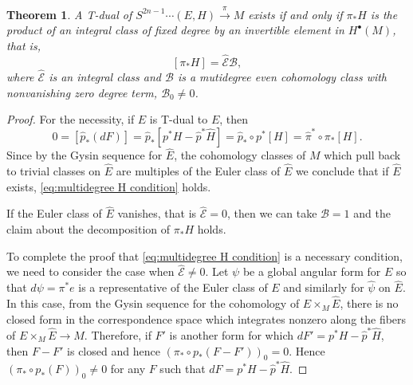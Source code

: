 \documentclass[12pt,twoside]{article}
\theoremstyle{plain}
\newtheorem{theorem}{Theorem}[section]
\theoremstyle{definition}
\newcommand{\mc}[1]{\text{$\mathcal{#1}$}}
\numberwithin{equation}{section}
\begin{document}
\begin{theorem}
A T-dual of $S^{2n-1}{\cdots} (E,H) \stackrel{\pi}{\longrightarrow} M$ exists if and only if $\pi_*H$ is the product of an integral class of fixed degree by an invertible element in $H^\bullet(M)$, that is,
\begin{equation}\label{eq:multidegree H condition}
[\pi_*H] = \hat{\mc{E}} \mc{B},
\end{equation}
where $\hat{\mc{E}}$ is an integral class and $\mc{B}$ is a mutidegree even cohomology class with nonvanishing zero degree term, $\mc{B}_0 \neq 0$.
\end{theorem}
\begin{proof}
For the necessity, if $\hat{E}$ is T-dual to $E$,  then
\begin{equation}\label{eq:restriction on H}
0 = [\hat{p}_*(dF)] = \hat{p}_*[p^*H - \hat{p}^*\hat{H}] =  \hat{p}_*\circ p^*[H] =   \hat{\pi}^*\circ \pi_*[H].
\end{equation}
Since by the Gysin sequence for $\hat{E}$, the cohomology classes of $M$ which pull back to trivial classes on $\hat{E}$ are multiples of the Euler class of $\hat{E}$ we conclude that if $\hat{E}$ exists,  \eqref{eq:multidegree H condition} holds.


If the Euler class of $\hat{E}$ vanishes, that is $\hat{\mc{E}} =0$, then we can take $\mc{B}=1$ and the claim about the decomposition of $\pi_*H$ holds.

To complete the proof that \eqref{eq:multidegree H condition} is a necessary condition, we need to consider the case when $\hat{\mc{E}} \neq 0$. Let $\psi$ be a global angular form for $E$ so that $d\psi = \pi^*e$ is a representative of the Euler class of $E$ and similarly for $\hat\psi$ on $\hat{E}$. In this case, from the Gysin sequence for the cohomology of $E\times_M \hat{E}$, there is no closed form in the correspondence space which integrates nonzero along the fibers of $E\times_M \hat{E} \to M$.
Therefore, if $F'$ is another form for which $dF' = p^*H -\hat{p}^*\hat{H}$, then $F-F'$ is closed and hence $(\pi_* \circ p_* (F-F'))_0 = 0$. Hence $(\pi_* \circ p_* (F))_0 \neq 0$ for any $F$ such that $dF =  p^*H -\hat{p}^*\hat{H}$. 


\end{proof}
\end{document}
